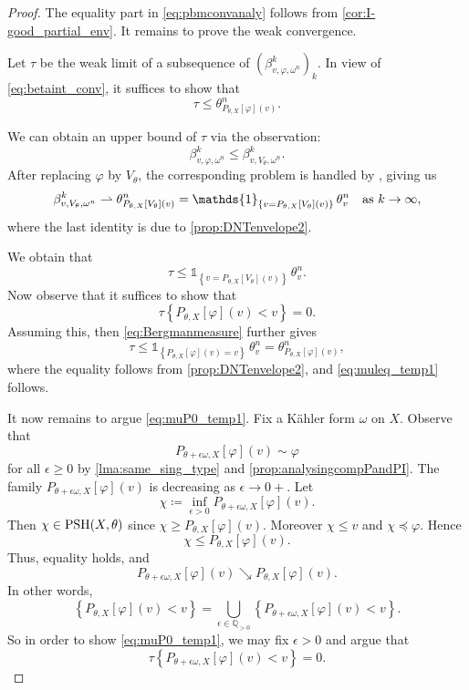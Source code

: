 \begin{proof} The equality part in \eqref{eq:pbmconvanaly} follows from \cref{cor:I-good_partial_env}. It remains to prove the weak convergence.

Let $\tau$ be the weak limit of a subsequence of $(\beta^k_{v,\varphi,\omega^n})_k$. In view of \eqref{eq:betaint_conv}, it suffices to show that
\begin{equation}\label{eq:muleq_temp1}
\tau\leq \theta_{P_{\theta,X}[\varphi](v)}^n.
\end{equation}

We can obtain an upper bound of $\tau$ via the observation:
\[
\beta^k_{v,\varphi,\omega^n} \leq \beta^k_{v,V_{\theta},\omega^n}.
\]
After replacing $\varphi$ by $V_{\theta}$, the corresponding problem is handled by \cite[Theorem~1.2]{Ber11}, giving us
\[
\beta^k_{v,V_{\theta},\omega^n} \rightharpoonup \theta_{P_{\theta,X}[V_{\theta}](v)}^n=\mathds{1}_{\left\{v = P_{\theta,X}[V_{\theta}](v)\right\}}\,\theta_v^n \quad \textup{as }k\to\infty,
\]
where the last identity is due to \cref{prop:DNTenvelope2}.

We obtain that
\begin{equation}\label{eq:Bergmanmeasure}
\tau \leq \mathds{1}_{\left\{v = P_{\theta,X}[V_{\theta}](v)\right\}}\,\theta_v^n.
\end{equation}
Now observe that it suffices to show that
\begin{equation}\label{eq:muP0_temp1}
\tau\left\{P_{\theta,X}[\varphi](v) < v\right\}=0.
\end{equation}
Assuming this, then \eqref{eq:Bergmanmeasure} further gives
\[
\tau \leq \mathds{1}_{\left\{P_{\theta,X}[\varphi](v)= v\right\}}\,\theta_v^n= \theta_{P_{\theta,X}[\varphi](v)}^n,
\]
where the equality follows from \cref{prop:DNTenvelope2}, and \eqref{eq:muleq_temp1} follows.

It now remains to argue \eqref{eq:muP0_temp1}. Fix a Kähler form $\omega$ on $X$. Observe that
\[
P_{\theta +\epsilon \omega,X}[\varphi](v) \sim \varphi
\]
for all $\epsilon\geq 0$ by \cref{lma:same_sing_type} and \cref{prop:analysingcompPandPI}. The family $P_{\theta+\epsilon\omega,X}[\varphi](v)$ is decreasing as $\epsilon\to0+$. Let
\[
    \chi\coloneqq \inf_{\epsilon>0}P_{\theta+\epsilon\omega,X}[\varphi](v).
\]
Then $\chi\in\mathrm{PSH}(X,\theta)$ since $\chi\geq P_{\theta,X}[\varphi](v)$. Moreover $\chi\leq v$ and $\chi\preceq\varphi$. Hence
\[
    \chi\leq P_{\theta,X}[\varphi](v).
\]
Thus, equality holds, and
\[
    P_{\theta+\epsilon\omega,X}[\varphi](v)\searrow P_{\theta,X}[\varphi](v).
\]
In other words,
\[
\left\{P_{\theta,X}[\varphi](v) < v\right\}=\bigcup_{\epsilon\in \mathbb{Q}_{>0}}\left\{P_{\theta+\epsilon\omega,X}[\varphi](v) < v\right\}.
\]
So in order to show \eqref{eq:muP0_temp1}, we may fix $\epsilon>0$ and argue that
\begin{equation}\label{eq:muP0_temp2}
\tau\left\{P_{\theta+\epsilon\omega,X}[\varphi](v) < v\right\}=0.
\end{equation}




\end{proof}
